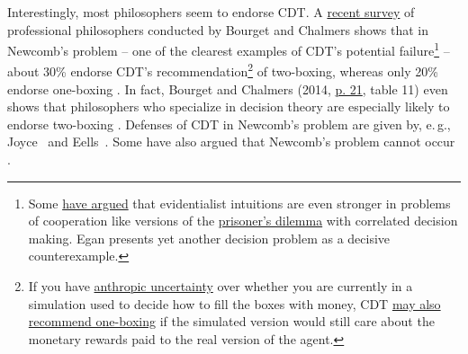 Interestingly,
most philosophers seem to endorse CDT. A
\href{http://philpapers.org/archive/BOUWDP}{recent survey} of
professional philosophers conducted by Bourget and Chalmers shows that
in Newcomb's problem -- one of the clearest examples of CDT's potential
failure\footnote{Some
  \href{https://sl4librarian.files.wordpress.com/2016/12/newcomb-hurley.pdf}{have
  argued} that evidentialist intuitions are even stronger in problems
  of cooperation like versions of the
  \href{https://en.wikipedia.org/wiki/Prisoner\%27s_dilemma}{prisoner's
  dilemma} with correlated decision making.
  Egan \citeyear{Egan2007-ey} presents yet another decision
  problem as a decisive counterexample.} -- about 30\% endorse CDT's
recommendation\footnote{If you have
  \href{http://www.anthropic-principle.com/?q=book/table_of_contents}{anthropic
  uncertainty} over whether you are currently in a simulation used to
  decide how to fill the boxes with money, CDT
  \href{http://lesswrong.com/lw/asi/anthropic_reasoning_by_cdt_in_newcombs_problem/}{may
  also} \href{http://www.scottaaronson.com/blog/?p=30}{recommend
  one-boxing} if the simulated version would still care about the
  monetary rewards paid to the real version of the agent.} of
two-boxing, whereas only 20\% endorse one-boxing
\parencite{Bourget2014-fm}. In fact, Bourget and Chalmers
(2014, \href{http://philpapers.org/archive/BOUWDP\#page=21}{p.
21}, table 11) even shows that philosophers who specialize in decision
theory are especially likely to endorse two-boxing
\parencite{Bourget2014-fm}. Defenses of CDT in Newcomb's
problem are given by, e.\,g., Joyce~\citeyear{Joyce1999-iv} and
Eells~\citeyear{Eells2016-ym}. Some have also argued that
Newcomb's problem cannot occur
\parencite{Binmore2007-uc,Ledwig2000-vp}.

